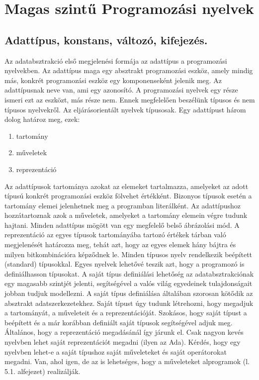 \section{Magas szintű Programozási nyelvek}
\subsection{Adattípus, konstans, változó, kifejezés.}
Az adatabsztrakció első megjelenési formája az adattípus a programozási nyelvekben. Az adattípus maga egy absztrakt programozási eszköz, amely mindig más, konkrét programozási eszköz egy komponenseként jelenik meg. Az adattípusnak neve van, ami egy azonosító. A programozási nyelvek
egy része ismeri ezt az eszközt, más része nem. Ennek megfelelően beszélünk típusos és nem típusos nyelvekről. Az eljárásorientált nyelvek típusosak. Egy adattípust három dolog határoz meg, ezek:
\begin{enumerate}[noitemsep]
	\item tartomány
	\item műveletek
	\item reprezentáció
\end{enumerate}
Az adattípusok tartománya azokat az elemeket tartalmazza, amelyeket az adott típusú konkrét programozási eszköz fölvehet értékként. Bizonyos típusok esetén a tartomány elemei jelenhetnek meg a programban literálként. Az adattípushoz hozzátartoznak azok a műveletek, amelyeket a tartomány elemein végre tudunk hajtani. Minden adattípus mögött van egy megfelelő belső ábrázolási mód. A reprezentáció az egyes típusok tartományába tartozó értékek tárban való megjelenését határozza meg, tehát azt, hogy az egyes elemek hány bájtra és milyen bitkombinációra képződnek le. Minden típusos nyelv rendelkezik beépített (standard) típusokkal. Egyes nyelvek lehetővé teszik azt, hogy a
programozó is definiálhasson típusokat. A saját típus definiálási lehetőség az adatabsztrakciónak egy magasabb szintjét jelenti, segítségével a valós világ egyedeinek tulajdonságait jobban tudjuk modellezni.
A saját típus definiálása általában szorosan kötődik az absztrakt adatszerkezetekhez. Saját típust úgy tudunk létrehozni, hogy megadjuk a tartományát, a műveleteit és a reprezentációját. Szokásos, hogy saját típust a beépített és a már korábban definiált saját típusok segítségével adjuk meg. Általános, hogy a reprezentáció megadásánál így járunk el. Csak nagyon kevés nyelvben lehet saját reprezentációt megadni (ilyen az Ada). Kérdés, hogy egy nyelvben lehet-e a saját típushoz saját műveleteket és saját operátorokat megadni. Van, ahol igen, de az is lehetséges, hogy a műveleteket alprogramok (l. 5.1. alfejezet) realizálják. %
